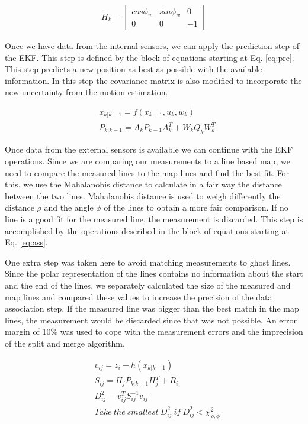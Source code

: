 \documentclass[journal]{IEEEtran}
\begin{document}
\begin{align}\label{H2}
H_k = 
\begin{bmatrix}
cos\phi_w & sin \phi_w & 0 \\
0 & 0 & -1
\end{bmatrix}
\end{align}

Once we have data from the internal sensors, we can apply the prediction step of the EKF. This step is defined by the block of equations starting at Eq. \ref{eq:pre}. This step predicts a new position as best as possible with the available information. In this step the covariance matrix is also modified to incorporate the new uncertainty from the motion estimation.

\begin{align}\label{eq:pre}
& x_{k|k-1} = f(x_{k-1},u_k , w_k)\\
& P_{k|k-1} = A_k P_{k-1} A_k^T + W_k Q_k W_k^T
\end{align}


Once data from the external sensors is available we can continue with the EKF operations. Since we are comparing our measurements to a line based map, we need to compare the measured lines to the map lines and find the best fit. For this, we use the Mahalanobis distance to calculate in a fair way the distance between the two lines. Mahalanobis distance is used to weigh differently the distance $\rho$ and the angle $\phi$ of the lines to obtain a more fair comparison. If no line is a good fit for the measured line, the measurement is discarded. This step is accomplished by the operations described in the block of equations starting at Eq. \ref{eq:ass}.

One extra step was taken here to avoid matching measurements to ghost lines. Since the polar representation of the lines contains no information about the start and the end of the lines, we separately calculated the size of the measured and map lines and compared these values to increase the precision of the data association step. If the measured line was bigger than the best match in the map lines, the measurement would be discarded since that was not possible. An error margin of 10\% was used to cope with the measurement errors and the imprecision of the split and merge algorithm.

\begin{align}\label{eq:ass}
& v_{ij} = z_i - h(x_{k|k-1})\\
& S_{ij} = H_j P_{k|k-1} H_j^T + R_i\\
& D_{ij}^2 = v_{ij}^T S_{ij}^{-1} v_{ij}\\
& Take~the~smallest~D_{ij}^2~if~D_{ij}^2<\chi_{\rho,\phi}^2
\end{align}
\end{document}
